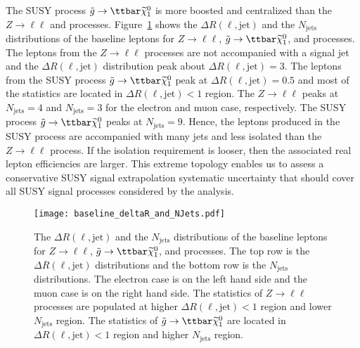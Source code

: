 The SUSY process $\tilde{g} \to \ttbar \widetilde{\chi}^{0}_{1}$ is more boosted and centralized than the $Z\to \ell \ell$ and \ttbar processes.
Figure~\ref{fig:app_RLE_dRjet_Njet} shows the $\Delta R(\ell, \mathrm{jet})$ and the $N_\mathrm{jets}$ distributions of the baseline leptons for $Z\to \ell\ell$, $\tilde{g} \to \ttbar \widetilde{\chi}^{0}_{1}$, and \ttbar processes.
The leptons from the $Z \to \ell \ell$ processes are not accompanied with a signal jet and the $\Delta R(\ell, \mathrm{jet})$ distribution peak about $\Delta R(\ell, \mathrm{jet}) = 3$.
The leptons from the SUSY process $\tilde{g} \to \ttbar \widetilde{\chi}^{0}_{1}$ peak at $\Delta R(\ell, \mathrm{jet}) = 0.5$ and most of the statistics are located in $\Delta R(\ell, \mathrm{jet}) < 1$ region.
The $Z \to \ell \ell$ peaks at $N_\mathrm{jets} = 4$ and $N_\mathrm{jets} = 3$ for the electron and muon case, respectively.
The SUSY process $\tilde{g} \to \ttbar \widetilde{\chi}^{0}_{1}$ peaks at $N_\mathrm{jets} = 9$.
Hence, the leptons produced in the SUSY process are accompanied with many jets and less isolated than the $Z \to \ell \ell$ process.
If the isolation requirement is looser, then the associated real lepton efficiencies are larger.
This extreme topology enables us to assess a conservative SUSY signal extrapolation systematic uncertainty that should cover all SUSY signal processes considered by the analysis.

\begin{figure}[htb]
    \texttt{[image: baseline\_deltaR\_and\_NJets.pdf]}
    \caption{The $\Delta R(\ell, \mathrm{jet})$ and the $N_\mathrm{jets}$ distributions of the baseline leptons for $Z\to \ell\ell$, $\tilde{g} \to \ttbar \widetilde{\chi}^{0}_{1}$, and \ttbar processes.
    The top row is the $\Delta R(\ell, \mathrm{jet})$ distributions and the bottom row is the $N_\mathrm{jets}$ distributions.
    The electron case is on the left hand side and the muon case is on the right hand side.
    The statistics of $Z \to \ell \ell$ processes are populated at higher $\Delta R(\ell, \mathrm{jet}) < 1$ region and lower $N_\mathrm{jets}$ region.
    The statistics of $\tilde{g} \to \ttbar \widetilde{\chi}^{0}_{1}$ are located in $\Delta R(\ell, \mathrm{jet}) < 1$ region and higher $N_\mathrm{jets}$ region.}
    \label{fig:app_RLE_dRjet_Njet}
\end{figure}

